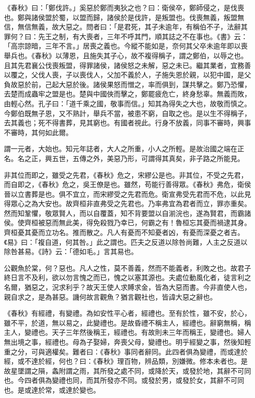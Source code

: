 《春秋》曰：「鄭伐許。」奚惡於鄭而夷狄之也？曰：衛侯卒，鄭師侵之，是伐喪也。鄭與諸侯盟於蜀，以盟而歸，諸侯於是伐許，是叛盟也。伐喪無義，叛盟無信，無信無義，故大惡之。問者曰：「是君死，其子未逾年，有稱伯不子，法辭其罪何？曰：先王之制，有大喪者，三年不呼其門，順其誌之不在事也。《書》云：「高宗諒暗，三年不言。」居喪之義也。今縱不能如是，奈何其父卒未逾年即以喪舉兵也。《春秋》以薄恩，且施失其子心，故不複得稱子，謂之鄭伯，以辱之也。且其先君襄公伐喪叛盟，得罪諸侯，諸侯怒之未解，惡之未已。繼其業者，宜務善以覆之，父伐人喪，子以喪伐人，父加不義於人，子施失恩於親，以犯中國，是父負故惡於前，己起大惡於後。諸侯果怒而憎之，率而俱到，謀共擊之。鄭乃恐懼，去楚而成蟲牢之盟是也。楚與中國俠而擊之，鄭罷疲危亡，終身愁辜。無義而敗，由輕心然。孔子曰：「道千乘之國，敬事而信。」知其為得失之大也，故敬而慎之。今鄭伯既無子恩，又不熟計，舉兵不當，被患不窮，自取之也。是以生不得稱子，去其義也；死不得書葬，見其窮也。有國者視此。行身不放義，同事不審時，興事不審時，其何如此爾。



謂一元者，大始也。知元年誌者，大人之所重，小人之所輕。是故治國之端在正名。名之正，興五世，五傳之外，美惡乃形，可謂得其真矣，非子路之所能見。


非其位而即之，雖受之先君，《春秋》危之，宋繆公是也。非其位，不受之先君，而自即之，《春秋》危之，吳王僚是也。雖然，苟能行善得眾。《春秋》弗危，衛侯晉以立書葬是也。俱不宜立，而宋繆受之先君而危。衛宣弗受先君而不危，以此見得眾心之為大安也。故齊桓非直弗受之先君也。乃率弗宜為君者而立，罪亦重矣。然而知鞏懼，敬眾賢人，而以自覆蓋，知不背要盟以自湔浣也，遂為賢君，而霸諸侯。使齊桓被惡而無此美，得免殺戮乃幸已，何霸之有！魯桓忘其憂而禍逮其身。齊桓憂其憂而立功名。推而散之。凡人有憂而不知憂者凶，有憂而深憂之者吉。《易》曰：「複自道，何其咎。」此之謂也。匹夫之反道以除咎尚難，人主之反道以除咎甚易。《詩》云：「德如毛。」言其易也。


公觀魚於棠，何？惡也。凡人之性，莫不善義，然而不能義者，利敗之也。故君子終日言不及利，欲以勿言愧之而已，愧之以塞其源也。夫處位動風化者，徒言利之名爾，猶惡之，況求利乎？故天王使人求賻求金，皆為大惡而書。今非直使人也，親自求之，是為甚惡。譏何故言觀魚？猶言觀社也，皆諱大惡之辭也。


《春秋》有經禮，有變禮。為如安性平心者，經禮也。至有於性，雖不安，於心，雖不平，於道，無以易之，此變禮也。是故昏禮不稱主人，經禮也。辭窮無稱，稱主人，變禮也。天子三年然後稱王，經禮也。有故則未三年而稱王，變禮也。婦人無出境之事，經禮也。母為子娶婦，奔喪父母，變禮也。明乎經變之事，然後知輕重之分，可與適權矣。難者曰：《春秋》事同者辭同。此四者俱為變禮，而或達於經，或不達於經，何也？曰：《春秋》理百物，辨品類，別嫌微。修本未者也。是故星墜謂之隕，螽附謂之雨，其所發之處不同，或降於天，或發於地，其辭不可同也。今四者俱為變禮也同，而其所發亦不同。或發於男，或發於女，其辭不可同也。是或達於常，或達於變也。



